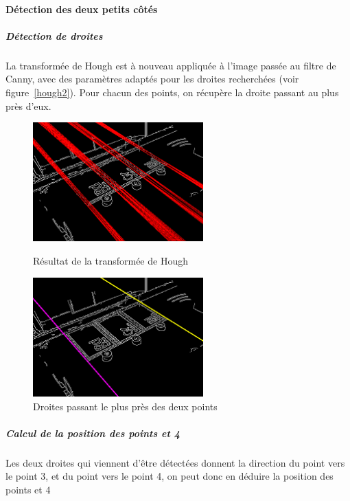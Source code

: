 \documentclass{report}
\begin{document}
\paragraph{Détection des deux petits côtés}
\subparagraph{Détection de droites}
La transformée de Hough est à nouveau appliquée à l’image passée au filtre de Canny, avec des paramètres adaptés pour
les droites recherchées (voir figure~\ref{hough2}).
Pour chacun des points, on récupère la droite passant au plus près d’eux.
\begin{figure}[!h] \hfill
  \begin{minipage}[t]{.4\linewidth}
    \begin{center}
    \includegraphics[height=130pt]{image_Canny_et_hough2.png}  
    \end{center}
    \caption{Résultat de la transformée de Hough}
    \label{hough2}
  \end{minipage} \hfill
  \begin{minipage}[t]{.4\linewidth}
    \begin{center}
    \includegraphics[height=130pt]{image_Canny_hough2_et_droites_choisies.png}  
    \end{center}
    \caption{Droites passant le plus près des deux points}
    \label{hough2bis}
  \end{minipage} \hfill\hfill
\end{figure}

\subparagraph{Calcul de la position des points  et 4}
Les deux droites qui viennent d’être détectées donnent la direction du point  vers le point 3, et du point  vers le point 4,
on peut donc en déduire la position des points  et 4
\end{document}
